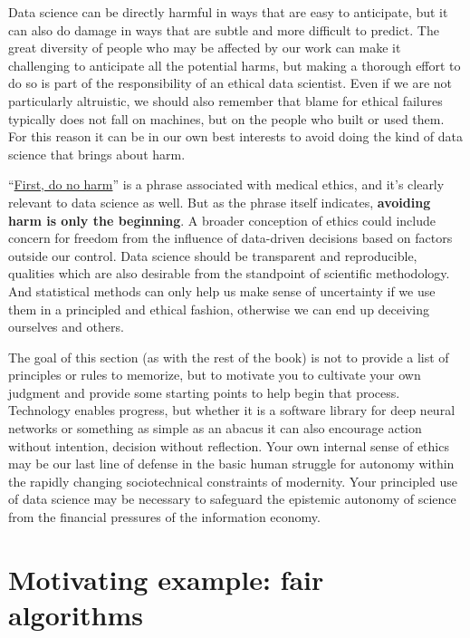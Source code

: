 \documentclass[]{book}
\theoremstyle{definition}
\theoremstyle{definition}
\theoremstyle{definition}
\theoremstyle{remark}
\begin{document}
Data science can be directly harmful in ways that are easy to
anticipate, but it can also do damage in ways that are subtle and more
difficult to predict. The great diversity of people who may be affected
by our work can make it challenging to anticipate all the potential
harms, but making a thorough effort to do so is part of the
responsibility of an ethical data scientist. Even if we are not
particularly altruistic, we should also remember that blame for ethical
failures typically does not fall on machines, but on the people who
built or used them. For this reason it can be in our own best interests
to avoid doing the kind of data science that brings about harm.

``\href{https://en.wikipedia.org/wiki/Primum_non_nocere}{First, do no
harm}'' is a phrase associated with medical ethics, and it's clearly
relevant to data science as well. But as the phrase itself indicates,
\textbf{avoiding harm is only the beginning}. A broader conception of
ethics could include concern for freedom from the influence of
data-driven decisions based on factors outside our control. Data science
should be transparent and reproducible, qualities which are also
desirable from the standpoint of scientific methodology. And statistical
methods can only help us make sense of uncertainty if we use them in a
principled and ethical fashion, otherwise we can end up deceiving
ourselves and others.

The goal of this section (as with the rest of the book) is not to
provide a list of principles or rules to memorize, but to motivate you
to cultivate your own judgment and provide some starting points to help
begin that process. Technology enables progress, but whether it is a
software library for deep neural networks or something as simple as an
abacus it can also encourage action without intention, decision without
reflection. Your own internal sense of ethics may be our last line of
defense in the basic human struggle for autonomy within the rapidly
changing sociotechnical constraints of modernity. Your principled use of
data science may be necessary to safeguard the epistemic autonomy of
science from the financial pressures of the information economy.

\section{Motivating example: fair
algorithms}\label{motivating-example-fair-algorithms}
\end{document}

